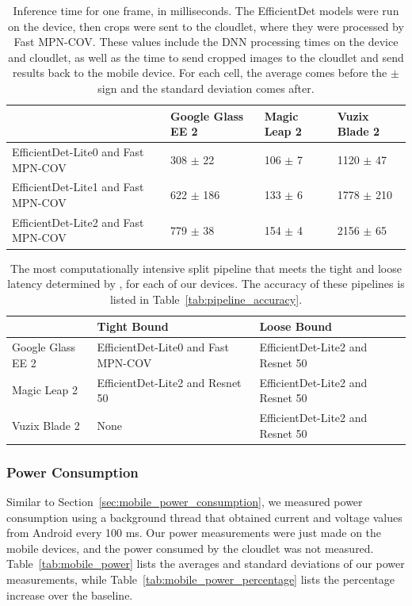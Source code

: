 \begin{table}
\begin{tabular}{|l||l|l|l|}
  \hline
  & Google Glass EE 2 & Magic Leap 2 & Vuzix Blade 2\\
  \hline
  \hline
  EfficientDet-Lite0 and Fast MPN-COV & 308 $\pm$ 22 & 106 $\pm$ 7 & 1120 $\pm$ 47\\
  EfficientDet-Lite1 and Fast MPN-COV & 622 $\pm$ 186 & 133 $\pm$ 6 & 1778 $\pm$ 210\\
  EfficientDet-Lite2 and Fast MPN-COV & 779 $\pm$ 38 & 154 $\pm$ 4 & 2156 $\pm$ 65\\
  \hline
\end{tabular}
  \caption{
    Inference time for one frame, in milliseconds.
    The EfficientDet models were run on the device, then crops were sent to the
    cloudlet, where they were processed by Fast MPN-COV.
    These values include the DNN processing times on the device and cloudlet, as
    well as the time to send cropped images to the cloudlet and send results
    back to the mobile device.
    For each cell, the average comes before the $\pm$ sign and the standard
    deviation comes after.
  }\label{tab:split_time}
\end{table}

\begin{table}
\begin{tabular}{|l||l|l|l|}
  \hline
  & Tight Bound & Loose Bound\\
  \hline
  \hline
  Google Glass EE 2 & EfficientDet-Lite0 and Fast MPN-COV & EfficientDet-Lite2 and Resnet 50\\
  Magic Leap 2 & EfficientDet-Lite2 and Resnet 50 & EfficientDet-Lite2 and Resnet 50\\
  Vuzix Blade 2 & None & EfficientDet-Lite2 and Resnet 50\\
  \hline
\end{tabular}
  \caption{
    The most computationally intensive split pipeline that meets the tight and
    loose latency determined by \citet{chen2017}, for each of our devices.
    The accuracy of these pipelines is listed in
    Table~\ref{tab:pipeline_accuracy}.
  }\label{tab:split_latency_bound}
\end{table}

\subsubsection{Power Consumption}

Similar to Section~\ref{sec:mobile_power_consumption}, we measured power
consumption using a background thread that obtained current and voltage values
from Android every 100 ms.
Our power measurements were just made on the mobile devices, and the power
consumed by the cloudlet was not measured.
Table~\ref{tab:mobile_power} lists the averages and standard deviations of our
power measurements, while Table~\ref{tab:mobile_power_percentage} lists the
percentage increase over the baseline.

